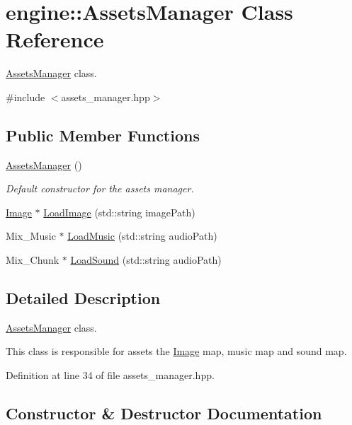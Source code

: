 \hypertarget{classengine_1_1_assets_manager}{}\section{engine\+:\+:Assets\+Manager Class Reference}
\label{classengine_1_1_assets_manager}


\hyperlink{classengine_1_1_assets_manager}{Assets\+Manager} class.  




{\ttfamily \#include $<$assets\+\_\+manager.\+hpp$>$}

\subsection*{Public Member Functions}
\begin{DoxyCompactItemize}
\item 
\hyperlink{classengine_1_1_assets_manager_a04b603ba0f5398921d0a2d13c8535acf}{Assets\+Manager} ()
\begin{DoxyCompactList}\small\item\em Default constructor for the assets manager. \end{DoxyCompactList}\item 
\hyperlink{structengine_1_1_image}{Image} $\ast$ \hyperlink{classengine_1_1_assets_manager_a3ba125182551280bcfdaf50aed863950}{Load\+Image} (std\+::string image\+Path)
\item 
Mix\+\_\+\+Music $\ast$ \hyperlink{classengine_1_1_assets_manager_a7244ff799dc6f501c09ef13686b7a991}{Load\+Music} (std\+::string audio\+Path)
\item 
Mix\+\_\+\+Chunk $\ast$ \hyperlink{classengine_1_1_assets_manager_a7592447ab48c251bab45c3a1540828fe}{Load\+Sound} (std\+::string audio\+Path)
\end{DoxyCompactItemize}


\subsection{Detailed Description}
\hyperlink{classengine_1_1_assets_manager}{Assets\+Manager} class. 

This class is responsible for assets the \hyperlink{structengine_1_1_image}{Image} map, music map and sound map. 

Definition at line 34 of file assets\+\_\+manager.\+hpp.



\subsection{Constructor \& Destructor Documentation}
